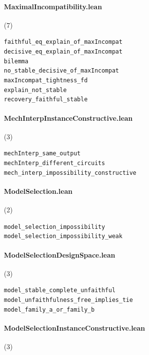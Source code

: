 \paragraph{MaximalIncompatibility.lean} (7)

{\footnotesize
\texttt{faithful\_eq\_explain\_of\_maxIncompat}\\
\texttt{decisive\_eq\_explain\_of\_maxIncompat}\\
\texttt{bilemma}\\
\texttt{no\_stable\_decisive\_of\_maxIncompat}\\
\texttt{maxIncompat\_tightness\_fd}\\
\texttt{explain\_not\_stable}\\
\texttt{recovery\_faithful\_stable}\\
}

\paragraph{MechInterpInstanceConstructive.lean} (3)

{\footnotesize
\texttt{mechInterp\_same\_output}\\
\texttt{mechInterp\_different\_circuits}\\
\texttt{mech\_interp\_impossibility\_constructive}\\
}

\paragraph{ModelSelection.lean} (2)

{\footnotesize
\texttt{model\_selection\_impossibility}\\
\texttt{model\_selection\_impossibility\_weak}\\
}

\paragraph{ModelSelectionDesignSpace.lean} (3)

{\footnotesize
\texttt{model\_stable\_complete\_unfaithful}\\
\texttt{model\_unfaithfulness\_free\_implies\_tie}\\
\texttt{model\_family\_a\_or\_family\_b}\\
}

\paragraph{ModelSelectionInstanceConstructive.lean} (3)

